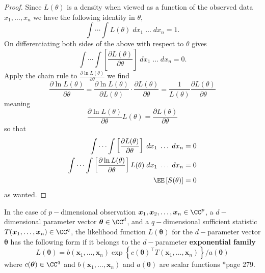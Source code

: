 \begin{proof}
    Since $L(\theta)$ is a density when viewed as a function of the observed data $x_1 , \ldots , x_n$ we have the following identity in $\theta$,
    \begin{equation*}
        \int \cdots \int L(\theta) \; d x_1 \; \ldots \; d x_n = 1.
    \end{equation*}
    On differentiating both sides of the above with respect to $\theta$ gives
    \begin{equation*}
        \int \cdots \int \left[ \frac{\partial L(\theta) }{\partial \theta} \right] \; d x_1 \; \ldots \; d x_n = 0.
    \end{equation*}
    Apply the chain rule to $\frac{\partial \ln L(\theta) }{\partial \theta}$ we find
    \begin{equation*}
        \frac{\partial \ln L(\theta) }{\partial \theta} = \frac{\partial \ln L(\theta) }{\partial L (\theta)} \cdot \frac{\partial L(\theta) }{\partial \theta} = \frac{1}{L(\theta)} \frac{\partial L(\theta) }{\partial \theta}
    \end{equation*}
    meaning
    \begin{equation*}
        \frac{\partial \ln L(\theta) }{\partial \theta} L(\theta) = \frac{\partial L(\theta) }{\partial \theta}
    \end{equation*}
    so that
    \begin{align*}
        \int \cdots \int \left[ \frac{\partial L(\theta) }{\partial \theta} \right] \; d x_1 \; \ldots \; d x_n               & = 0 \\
        \int \cdots \int \left[ \frac{\partial \ln L(\theta) }{\partial \theta} \right] L(\theta) \; d x_1 \; \ldots \; d x_n & = 0 \\
        \EE \left[ S (\theta) \right]                                                                                         & = 0
    \end{align*}
    as wanted.
\end{proof}

\begin{defe} \label{defe: exp_fam}
    In the case of $p-$dimensional observation $\bm{x}_1 , \bm{x}_2 , \ldots , \bm{x}_n \in \CC^{p}$, a $d-$dimensional parameter vector $\bm{\theta} \in \CC^{d}$, and a $q-$dimensional sufficient statistic $T(\bm{x}_1 , \ldots , \bm{x}_n) \in \CC^{q}$, the likelihood function $L (\bm{\theta})$ for the $d-$parameter vector $\bm{\theta}$ has the following form if it belongs to the $d-$parameter {\bf exponential family}
    \begin{equation*}
        L (\bm{\theta}) = b(\bm{x}_1 , \ldots , \bm{x}_n) \exp \left\{ c(\bm{\theta})^{\intercal} T(\bm{x}_1 , \ldots , \bm{x}_n) \right\} / a(\bm{\theta})
    \end{equation*}
    where $c(\bm{\theta}) \in \CC^{q}$ and $b(\bm{x}_1 , \ldots , \bm{x}_n)$ and $a(\bm{\theta})$ are scalar functions \cite{CasellaGeorge2001SI}*{page 279}.
\end{defe}

